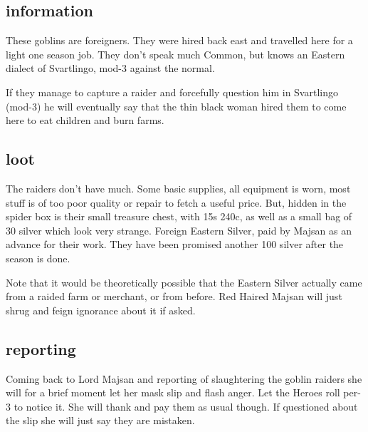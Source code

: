 \subsection*{information}
These goblins are foreigners. They were hired back east and travelled here for a light one season job. They don't speak much Common, but knows an Eastern dialect of Svartlingo, mod-3 against the normal.

If they manage to capture a raider and forcefully question him in Svartlingo (mod-3) he will eventually say that the thin black woman hired them to come here to eat children and burn farms.


\subsection*{loot}
The raiders don't have much. Some basic supplies, all equipment is worn, most stuff is of too poor quality or repair to fetch a useful price. But, hidden in the spider box is their small treasure chest, with 15s 240c, as well as a small bag of 30 silver which look very strange. Foreign Eastern Silver, paid by Majsan as an advance for their work. They have been promised another 100 silver after the season is done.

Note that it would be theoretically possible that the Eastern Silver actually came from a raided farm or merchant, or from before. Red Haired Majsan will just shrug and feign ignorance about it if asked.


\subsection*{reporting}
Coming back to Lord Majsan and reporting of slaughtering the goblin raiders she will for a brief moment let her mask slip and flash anger. Let the Heroes roll per-3 to notice it. She will thank and pay them as usual though. If questioned about the slip she will just say they are mistaken.










